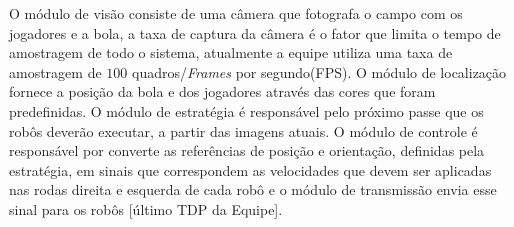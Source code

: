 O módulo de visão consiste de uma câmera que fotografa o campo com os jogadores e a bola, a taxa de captura da câmera é o fator que limita o tempo de amostragem de todo o sistema, atualmente a equipe utiliza uma taxa de amostragem de $100$ quadros/\emph{Frames} por segundo(FPS). O módulo de localização fornece a posição da bola e dos jogadores através das cores que foram predefinidas. O módulo de estratégia é responsável pelo próximo passe que os robôs deverão executar, a partir das imagens atuais. O módulo de controle é responsável por converte as referências de posição e orientação, definidas pela estratégia, em sinais que correspondem as velocidades que devem ser aplicadas nas rodas direita e esquerda de cada robô e o módulo de transmissão envia esse sinal para os robôs [último TDP da Equipe].\\




